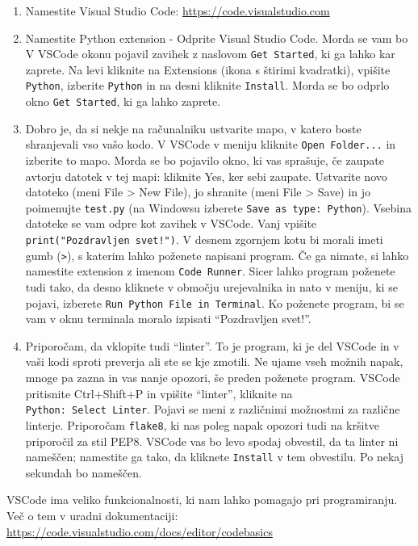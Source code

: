 \documentclass[
]{book}
\providecommand{\tightlist}{%
  \setlength{\itemsep}{0pt}\setlength{\parskip}{0pt}}
\begin{document}
\begin{enumerate}
\def\labelenumi{\arabic{enumi}.}
\setcounter{enumi}{2}
\tightlist
\item
  Namestite Visual Studio Code: \url{https://code.visualstudio.com}
\item
  Namestite Python extension - Odprite Visual Studio Code. Morda se vam bo V
  VSCode okonu pojavil zavihek z naslovom \texttt{Get\ Started}, ki ga lahko kar zaprete.
  Na levi kliknite na Extensions (ikona s štirimi kvadratki), vpišite \texttt{Python},
  izberite \texttt{Python} in na desni kliknite \texttt{Install}. Morda se bo odprlo okno
  \texttt{Get\ Started}, ki ga lahko zaprete.
\item
  Dobro je, da si nekje na računalniku ustvarite mapo, v katero boste shranjevali
  vso vašo kodo. V VSCode v meniju kliknite \texttt{Open\ Folder...} in izberite to mapo.
  Morda se bo pojavilo okno, ki vas sprašuje, če zaupate avtorju datotek
  v tej mapi: kliknite Yes, ker sebi zaupate. Ustvarite novo datoteko
  (meni File \textgreater{} New File), jo shranite (meni File \textgreater{} Save) in jo poimenujte
  \texttt{test.py} (na Windowsu izberete \texttt{Save\ as\ type:\ Python}). Vsebina datoteke se vam
  odpre kot zavihek v VSCode. Vanj vpišite \texttt{print("Pozdravljen\ svet!")}. V desnem
  zgornjem kotu bi morali imeti gumb (\texttt{\textbar{}\textgreater{}}), s katerim lahko poženete napisani program.
  Če ga nimate, si lahko namestite extension z imenom \texttt{Code\ Runner}. Sicer lahko
  program poženete tudi tako, da desno kliknete v območju urejevalnika in nato v
  meniju, ki se pojavi, izberete \texttt{Run\ Python\ File\ in\ Terminal}. Ko poženete program,
  bi se vam v oknu terminala moralo izpisati ``Pozdravljen svet!''.
\item
  Priporočam, da vklopite tudi ``linter''. To je program, ki je del VSCode in
  v vaši kodi sproti preverja ali ste se kje zmotili. Ne ujame vseh možnih napak,
  mnoge pa zazna in vas nanje opozori, še preden poženete program.
  VSCode pritisnite Ctrl+Shift+P in vpišite ``linter'', kliknite na
  \texttt{Python:\ Select\ Linter}. Pojavi se meni z različnimi možnostmi za različne linterje.
  Priporočam \texttt{flake8}, ki nas poleg napak opozori tudi na kršitve priporočil za stil
  PEP8. VSCode vas bo levo spodaj obvestil, da ta linter ni nameščen;
  namestite ga tako, da kliknete \texttt{Install} v tem obvestilu. Po nekaj sekundah bo nameščen.
\end{enumerate}

VSCode ima veliko funkcionalnosti, ki nam lahko pomagajo pri programiranju.
Več o tem v uradni dokumentaciji: \url{https://code.visualstudio.com/docs/editor/codebasics}
\end{document}

